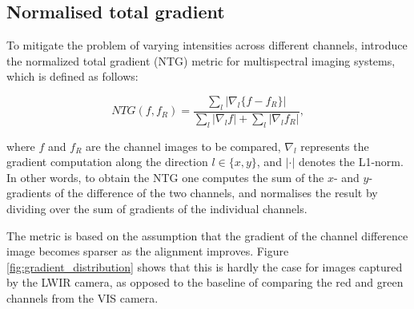\documentclass{l4proj}
\begin{document}
\subsection{Normalised total gradient}

To mitigate the problem of varying intensities across different channels, \citet{chen_normalized_2018} introduce the normalized total gradient (NTG) metric for multispectral imaging systems, which is defined as follows:

\begin{equation}
  NTG(f, f_R) = \frac{\sum_l |\nabla_l \{f - f_R\}|}{\sum_l | \nabla_l f | + \sum_l | \nabla_l f_R|},
\end{equation}

where $f$ and $f_R$ are the channel images to be compared, $\nabla_l$ represents the gradient computation along the direction $l \in \{x, y\}$, and $| \cdot |$ denotes the L1-norm. In other words, to obtain the NTG one computes the sum of the $x$- and $y$-gradients of the difference of the two channels, and normalises the result by dividing over the sum of gradients of the individual channels.

The metric is based on the assumption that the gradient of the channel difference image becomes sparser as the alignment improves. Figure \ref{fig:gradient_distribution} shows that this is hardly the case for images captured by the LWIR camera, as opposed to the baseline of comparing the red and green channels from the VIS camera.
\end{document}
